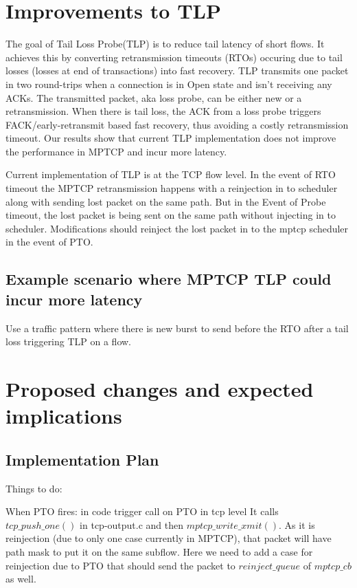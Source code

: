 \documentclass[12pt,draftcls,onecolumn]{IEEEtran}
\begin{document}
\section{Improvements to TLP}
The goal of Tail Loss Probe(TLP) is to reduce tail latency of short flows. It achieves this by converting retransmission timeouts (RTOs) occuring due to tail losses (losses at end of transactions) into fast recovery. TLP transmits one packet in two round-trips when a connection is in Open state and isn't receiving any ACKs. The transmitted packet, aka loss probe, can be either new or a retransmission. When there is tail loss, the ACK from a loss probe triggers FACK/early-retransmit based fast recovery, thus avoiding a costly retransmission timeout. Our results show that current TLP implementation does not improve the performance in MPTCP and incur more latency.

Current implementation of TLP is at the TCP flow level. In the event of RTO timeout the MPTCP retransmission happens with a reinjection in to scheduler along with sending lost packet on the same path. But in the Event of Probe timeout, the lost packet is being sent on the same path without injecting in to scheduler.  Modifications should reinject the lost packet in to the mptcp scheduler in the event of PTO.

\subsection{Example scenario where MPTCP TLP could incur more latency}

Use a traffic pattern where there is new burst to send before the RTO after a tail loss triggering TLP on a flow.


\section{Proposed changes and expected implications}


\subsection{Implementation Plan}

Things to do:



When PTO fires: in code trigger call on PTO in tcp level
It calls ${tcp\_push\_one()}$ in tcp-output.c and then ${mptcp\_write\_xmit()}$.
As it is reinjection (due to only one case currently in MPTCP), that packet will have path mask
to put it on the same subflow. Here we need to add a case for reinjection due to PTO that should
send the packet to $reinject\_queue$ of ${mptcp\_cb}$ as well.
\end{document}
